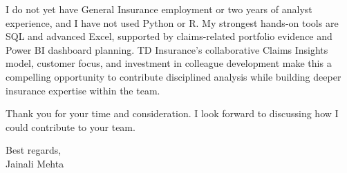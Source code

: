 \documentclass[letterpaper,10pt]{article}
\begin{document}
I do not yet have General Insurance employment or two years of analyst experience, and I have not used Python or R. My strongest hands-on tools are SQL and advanced Excel, supported by claims-related portfolio evidence and Power BI dashboard planning. TD Insurance's collaborative Claims Insights model, customer focus, and investment in colleague development make this a compelling opportunity to contribute disciplined analysis while building deeper insurance expertise within the team.

Thank you for your time and consideration. I look forward to discussing how I could contribute to your team.

Best regards,\\[8pt]
Jainali Mehta
\end{document}
